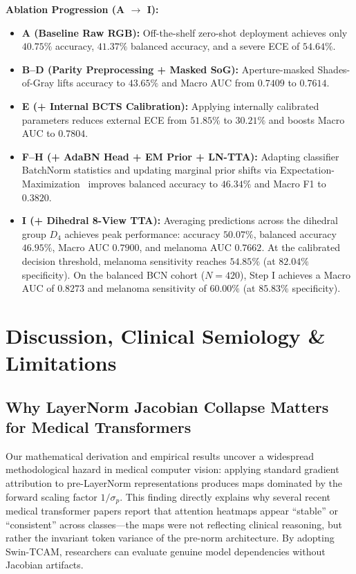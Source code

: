 \documentclass[11pt,a4paper]{article}
\begin{document}
\textbf{Ablation Progression (A $\rightarrow$ I):}
\begin{itemize}
    \item \textbf{A (Baseline Raw RGB):} Off-the-shelf zero-shot deployment achieves only $40.75\%$ accuracy, $41.37\%$ balanced accuracy, and a severe ECE of $54.64\%$.
    \item \textbf{B--D (Parity Preprocessing + Masked SoG):} Aperture-masked Shades-of-Gray lifts accuracy to $43.65\%$ and Macro AUC from $0.7409$ to $0.7614$.
    \item \textbf{E (+ Internal BCTS Calibration):} Applying internally calibrated parameters reduces external ECE from $51.85\%$ to $30.21\%$ and boosts Macro AUC to $0.7804$.
    \item \textbf{F--H (+ AdaBN Head + EM Prior + LN-TTA):} Adapting classifier BatchNorm statistics and updating marginal prior shifts via Expectation-Maximization~\cite{saerens2002adjusting, niu2023towards} improves balanced accuracy to $46.34\%$ and Macro F1 to $0.3820$.
    \item \textbf{I (+ Dihedral 8-View TTA):} Averaging predictions across the dihedral group $D_4$ achieves peak performance: accuracy $50.07\%$, balanced accuracy $46.95\%$, Macro AUC $0.7900$, and melanoma AUC $0.7662$. At the calibrated decision threshold, melanoma sensitivity reaches $54.85\%$ (at $82.04\%$ specificity). On the balanced BCN cohort ($N=420$), Step I achieves a Macro AUC of $0.8273$ and melanoma sensitivity of $60.00\%$ (at $85.83\%$ specificity).
\end{itemize}

\section{Discussion, Clinical Semiology \& Limitations}
\label{sec:discussion}

\subsection{Why LayerNorm Jacobian Collapse Matters for Medical Transformers}
Our mathematical derivation and empirical results uncover a widespread methodological hazard in medical computer vision: applying standard gradient attribution to pre-LayerNorm representations produces maps dominated by the forward scaling factor $1/\sigma_p$. This finding directly explains why several recent medical transformer papers report that attention heatmaps appear ``stable'' or ``consistent'' across classes—the maps were not reflecting clinical reasoning, but rather the invariant token variance of the pre-norm architecture. By adopting Swin-TCAM, researchers can evaluate genuine model dependencies without Jacobian artifacts.
\end{document}
